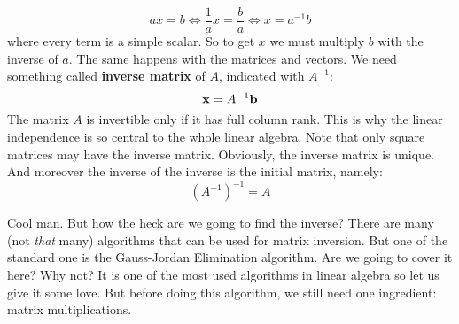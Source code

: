 \documentclass[computationalMathematics.tex]{subfiles}
\begin{document}
\[
    a x = b \iff \frac{1}{a} x = \frac{b}{a} \iff x = a^{-1} b
\]
where every term is a simple scalar. So to get $x$ we must multiply $b$ with the inverse of $a$. The same happens with the matrices and vectors. We need something called \textbf{inverse matrix} of $A$, indicated with $A^{-1}$:
\[
    {\bf x } = A^{-1} {\bf b }
\]
The matrix $A$ is invertible only if it has full column rank. This is why the linear independence is so central to the whole linear algebra. Note that only square matrices may have the inverse matrix. Obviously, the inverse matrix is unique. And moreover the inverse of the inverse is the initial matrix, namely:
\[
    (A^{-1})^{-1} = A
\]
\par Cool man. But how the heck are we going to find the inverse? There are many (not \textit{that} many) algorithms that can be used for matrix inversion. But one of the standard one is the Gauss-Jordan Elimination algorithm. Are we going to cover it here? Why not? It is one of the most used algorithms in linear algebra so let us give it some love. But before doing this algorithm, we still need one ingredient: matrix multiplications.
\end{document}
